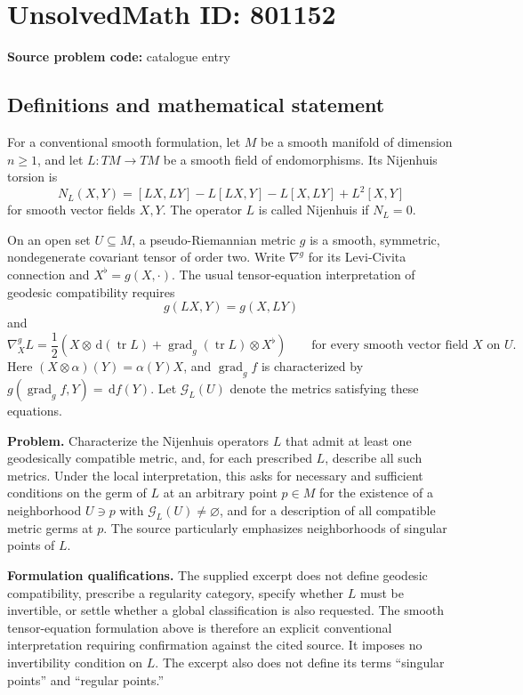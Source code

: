 \documentclass[11pt]{article}
\newcommand{\dd}{\,\mathrm{d}}
\begin{document}
\section*{UnsolvedMath ID: 801152}
\textbf{Source problem code:} catalogue entry
\subsection{Definitions and mathematical statement}
For a conventional smooth formulation, let \(M\) be a smooth manifold of dimension \(n\geq 1\), and let \(L\colon TM\to TM\) be a smooth field of endomorphisms. Its Nijenhuis torsion is
\[
N_L(X,Y)=[LX,LY]-L[LX,Y]-L[X,LY]+L^2[X,Y]
\]
for smooth vector fields \(X,Y\). The operator \(L\) is called Nijenhuis if \(N_L=0\).

On an open set \(U\subseteq M\), a pseudo-Riemannian metric \(g\) is a smooth, symmetric, nondegenerate covariant tensor of order two. Write \(\nabla^g\) for its Levi-Civita connection and \(X^\flat=g(X,\cdot)\). The usual tensor-equation interpretation of geodesic compatibility requires
\[
g(LX,Y)=g(X,LY)
\]
and
\[
\nabla^g_X L
=\frac12\left(X\otimes \dd(\operatorname{tr}L)
+\operatorname{grad}_g(\operatorname{tr}L)\otimes X^\flat\right)
\qquad\text{for every smooth vector field }X\text{ on }U.
\]
Here \((X\otimes\alpha)(Y)=\alpha(Y)X\), and \(\operatorname{grad}_g f\) is characterized by \(g(\operatorname{grad}_g f,Y)=\dd f(Y)\). Let \(\mathcal G_L(U)\) denote the metrics satisfying these equations.

\textbf{Problem.} Characterize the Nijenhuis operators \(L\) that admit at least one geodesically compatible metric, and, for each prescribed \(L\), describe all such metrics. Under the local interpretation, this asks for necessary and sufficient conditions on the germ of \(L\) at an arbitrary point \(p\in M\) for the existence of a neighborhood \(U\ni p\) with \(\mathcal G_L(U)\neq\varnothing\), and for a description of all compatible metric germs at \(p\). The source particularly emphasizes neighborhoods of singular points of \(L\).

\textbf{Formulation qualifications.} The supplied excerpt does not define geodesic compatibility, prescribe a regularity category, specify whether \(L\) must be invertible, or settle whether a global classification is also requested. The smooth tensor-equation formulation above is therefore an explicit conventional interpretation requiring confirmation against the cited source. It imposes no invertibility condition on \(L\). The excerpt also does not define its terms ``singular points'' and ``regular points.''
\end{document}

